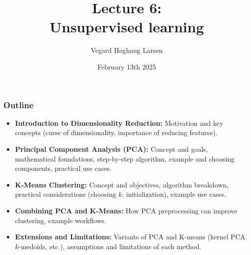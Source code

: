 \documentclass[aspectratio=169]{beamer}
\title{Lecture 6:\\ Unsupervised learning}
\institute{GRA4160: Predictive modelling with machine learning}
\date{February 13th 2025}
\author{Vegard H\o ghaug Larsen}
\begin{document}
\maketitle


\begin{frame}
      \frametitle{Outline}
      \begin{itemize}
            \item \textbf{Introduction to Dimensionality Reduction:} Motivation and key concepts (curse of dimensionality, importance of reducing features).
            \item \textbf{Principal Component Analysis (PCA):} Concept and goals, mathematical foundations, step-by-step algorithm, example and choosing components, practical use cases.
            \item \textbf{K-Means Clustering:} Concept and objectives, algorithm breakdown, practical considerations (choosing $k$, initialization), example use cases.
            \item \textbf{Combining PCA and K-Means:} How PCA preprocessing can improve clustering, example workflows.
            \item \textbf{Extensions and Limitations:}  Variants of PCA and K-means (kernel PCA, $k$-medoids, etc.), assumptions and limitations of each method.
      \end{itemize}
\end{frame}

\end{document}
